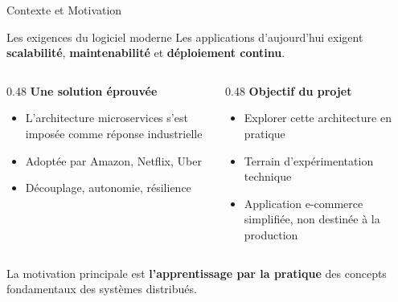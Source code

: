 \documentclass[aspectratio=169]{beamer}
\begin{document}
\begin{frame}{Contexte et Motivation}

  \begin{block}{\faExclamationTriangle\quad Les exigences du logiciel moderne}
    Les applications d'aujourd'hui exigent \textbf{scalabilité},
    \textbf{maintenabilité} et \textbf{déploiement continu}.
  \end{block}

  \vspace{0.8em}

  \begin{columns}[T]
    \begin{column}{0.48\textwidth}
      \textbf{\color{primary}Une solution éprouvée}
      \begin{itemize}
        \item L'architecture microservices s'est imposée comme réponse industrielle
        \item Adoptée par \alert{Amazon}, \alert{Netflix}, \alert{Uber}
        \item Découplage, autonomie, résilience
      \end{itemize}
    \end{column}
    \begin{column}{0.48\textwidth}
      \textbf{\color{primary}Objectif du projet}
      \begin{itemize}
        \item Explorer cette architecture \alert{en pratique}
        \item Terrain d'expérimentation technique
        \item Application e-commerce simplifiée, non destinée à la production
      \end{itemize}
    \end{column}
  \end{columns}

  \vspace{0.8em}
  \begin{alertblock}{}
    \centering
    \small La motivation principale est \textbf{l'apprentissage par la pratique}
    des concepts fondamentaux des systèmes distribués.
  \end{alertblock}

\end{frame}
\end{document}
